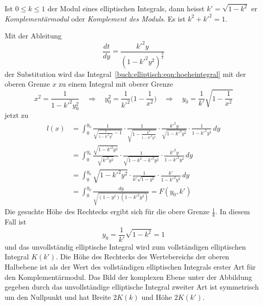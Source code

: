 \begin{definition}
Ist $0\le k\le 1$ der Modul eines elliptischen Integrals, dann heisst
$k' = \sqrt{1-k^2}$ er {\em Komplementärmodul} oder {\em Komplement
des Moduls}. Es ist $k^2+k'^2=1$.
\end{definition}

Mit der Ableitung
\[
\frac{dt}{dy}
=
\frac{k'^2 y}{(1-k'^2y^2)^{\frac32}}
\]
der Substitution
wird das Integral~\eqref{buch:elliptisch:eqn:hoeheintegral} mit der
oberen Grenze $x$ zu einem Integral mit oberer Grenze
\[
x^2 = \frac{1}{1-k'^2y_0^2}
\quad\Rightarrow\quad
y_0^2 = \frac{1}{k'^2}\biggl(1-\frac{1}{x^2}\biggr)
\quad\Rightarrow\quad
y_0=\frac{1}{k'}\sqrt{1-\frac{1}{x^2}}
\]
jetzt zu
\begin{align*}
l(x)
&=
\int_0^{y_0}
\frac{1}{\sqrt{\frac{1}{1-k'^2y^2}-1}}
\cdot
\frac{1}{\sqrt{1-\frac{k^2}{1-k'^2y^2}}}
\cdot
\frac{k'^2y}{\sqrt{1-k'^2y^2}}
\cdot
\frac{1}{1-k'^2y^2}
\,dy
\\
&=
\int_0^{y_0}
\frac{\sqrt{1-k'^2y^2}}{\sqrt{k'^2y^2}}
\cdot
\frac{1}{\sqrt{1-k^2 -k'^2y^2}}
\cdot
\frac{k'^2y}{1-k'^2y^2}
\,dy
\\
&=
\int_0^{y_0}
\sqrt{1-k'^2y^2}
\cdot
\frac{1}{k'\sqrt{1-y^2}}
\cdot
\frac{k'}{1-k'^2y^2}
\,dy
\\
&=
\int_0^{y_0} \frac{dy}{\sqrt{(1-y^2)(1-k'^2y^2)}}
=
F(y_0,k')
\end{align*}
Die gesuchte Höhe des Rechtecks ergibt sich für die obere Grenze $\frac1k$.
In diesem Fall ist
\[
y_0
=
\frac{1}{k'}\sqrt{1-k^2} = 1
\]
und das unvollständig elliptische Integral wird zum vollständigen
elliptischen Integral $K(k')$.
Die Höhe des Rechtecks des Wertebereichs der oberen Halbebene ist
als der Wert des vollständigen elliptischen Integrals erster Art
für den Komplementärmodul.
Das Bild der komplexen Ebene unter der Abbildung gegeben durch das
unvollständige elliptische Integral zweiter Art ist symmetrisch um
den Nullpunkt und hat Breite $2K(k)$ und Höhe $2K(k')$.

